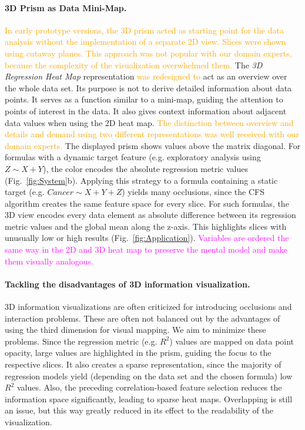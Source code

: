 \documentclass[journal]{style/vgtc} 			          %
\newcommand{\design}[1]{\textcolor{orange}{#1}}
\newcommand{\magenta}[1]{\textcolor{magenta}{#1}}
\begin{document}
\paragraph{3D Prism as Data Mini-Map.}
\design{
In early prototype versions, the 3D prism acted as starting point for the data analysis without the implementation of a separate 2D view.
Slices were shown using cutaway planes.
This approach was not popular with our domain experts, because the complexity of the visualization overwhelmed them. %
}
The \emph{3D Regression Heat Map} representation \design{was redesigned to} act as an overview over the whole data set.
Its purpose is not to derive detailed information about data points.
It serves as a function similar to a mini-map, guiding the attention to points of interest in the data.
It also gives context information about adjacent data values when using the 2D heat map.
\design{The distinction between overview and details and demand using two different representations was well received with our domain experts.}
The displayed prism shows values above the matrix diagonal.
For formulas with a dynamic target feature (e.g. exploratory analysis using $Z \sim X + Y$), the color encodes the absolute regression metric values (Fig.~\ref{fig:System}b).
Applying this strategy to a formula containing a static target (e.g. $Cancer \sim X + Y + Z$) yields many occlusions, since the CFS algorithm creates the same feature space for every slice.
For such formulas, the 3D view encodes every data element as absolute difference between its regression metric values and the global mean along the z-axis.
This highlights slices with unusually low or high results (Fig.~\ref{fig:Application}).
\magenta{Variables are ordered the same way in the 2D and 3D heat map to preserve the mental model and make them visually analogous.}

\paragraph{Tackling the disadvantages of 3D information visualization.}
3D information visualizations are often criticized for introducing occlusions and interaction problems.
These are often not balanced out by the advantages of using the third dimension for visual mapping.
We aim to minimize these problems.
Since the regression metric (e.g. $R^2$) values are mapped on data point opacity, large values are highlighted in the prism, guiding the focus to the respective slices.
It also creates a sparse representation, since the majority of regression models yield (depending on the data set and the chosen formula) low $R^2$ values.
Also, the preceding correlation-based feature selection reduces the information space significantly, leading to sparse heat maps.
Overlapping is still an issue, but this way greatly reduced in its effect to the readability of the visualization.
\end{document}
